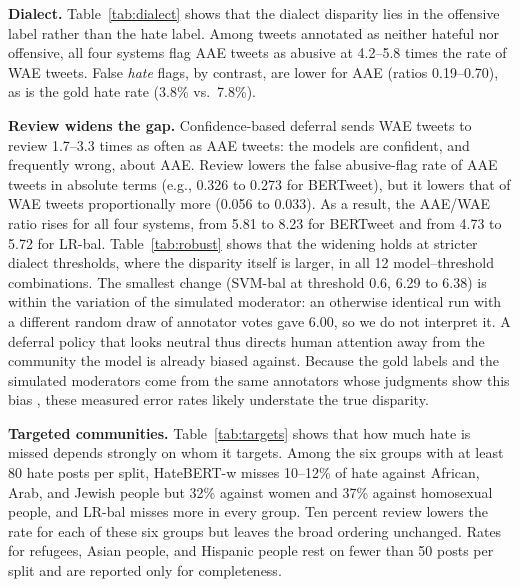 \documentclass[lettersize,journal]{IEEEtran}
\begin{document}
\begin{table}[t]
\centering
\caption{Robustness of the Dialect Result: AAE/WAE Ratio of False Abusive-Flag Rates Without $\to$ With 10\% Review, at Three Posterior Thresholds}
\label{tab:robust}
\scriptsize
\setlength{\tabcolsep}{4pt}

\end{table}

\textbf{Dialect.} Table~\ref{tab:dialect} shows that the dialect disparity lies in the offensive label rather than the hate label. Among tweets annotated as neither hateful nor offensive, all four systems flag AAE tweets as abusive at 4.2--5.8 times the rate of WAE tweets. False \emph{hate} flags, by contrast, are lower for AAE (ratios 0.19--0.70), as is the gold hate rate (3.8\% vs.\ 7.8\%).

\textbf{Review widens the gap.} Confidence-based deferral sends WAE tweets to review 1.7--3.3 times as often as AAE tweets: the models are confident, and frequently wrong, about AAE. Review lowers the false abusive-flag rate of AAE tweets in absolute terms (e.g., 0.326 to 0.273 for BERTweet), but it lowers that of WAE tweets proportionally more (0.056 to 0.033). As a result, the AAE/WAE ratio rises for all four systems, from 5.81 to 8.23 for BERTweet and from 4.73 to 5.72 for LR-bal. Table~\ref{tab:robust} shows that the widening holds at stricter dialect thresholds, where the disparity itself is larger, in all 12 model--threshold combinations. The smallest change (SVM-bal at threshold 0.6, 6.29 to 6.38) is within the variation of the simulated moderator: an otherwise identical run with a different random draw of annotator votes gave 6.00, so we do not interpret it. A deferral policy that looks neutral thus directs human attention away from the community the model is already biased against. Because the gold labels and the simulated moderators come from the same annotators whose judgments show this bias \cite{sap2019risk}, these measured error rates likely understate the true disparity.

\begin{table}[t]
\centering
\caption{Missed-Hate Rate by Targeted Community on HateXplain With 0\% and 10\% Review (Mean Over Splits). Hate Posts: Mean Number per Test Split. $^{*}$Fewer Than 50 Hate Posts per Split; Interpret With Caution.}
\label{tab:targets}
\scriptsize
\setlength{\tabcolsep}{3pt}

\end{table}

\textbf{Targeted communities.} Table~\ref{tab:targets} shows that how much hate is missed depends strongly on whom it targets. Among the six groups with at least 80 hate posts per split, HateBERT-w misses 10--12\% of hate against African, Arab, and Jewish people but 32\% against women and 37\% against homosexual people, and LR-bal misses more in every group. Ten percent review lowers the rate for each of these six groups but leaves the broad ordering unchanged. Rates for refugees, Asian people, and Hispanic people rest on fewer than 50 posts per split and are reported only for completeness.
\end{document}
